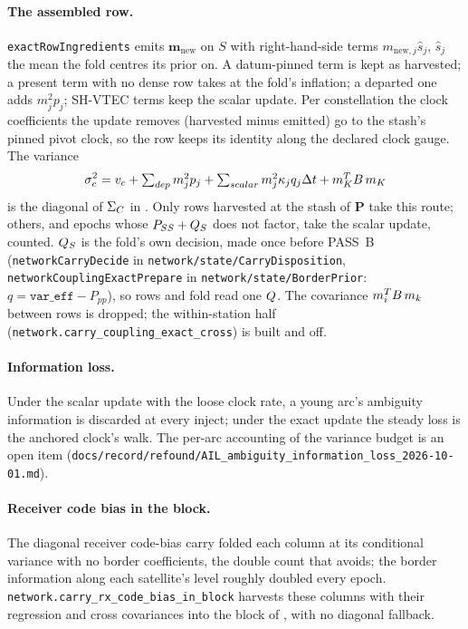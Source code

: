 \documentclass[main.tex]{subfiles}
\begin{document}
\paragraph{The assembled row.}
\texttt{exactRowIngredients} emits $\bm{m}_{\mathrm{new}}$ on $S$ with
right-hand-side terms $m_{\mathrm{new},j}\hat s_j$, $\hat s_j$ the mean the
fold centres its prior on. A datum-pinned term is kept as harvested; a
present term with no dense row takes  at the fold's
inflation; a departed one adds $m_j^2 p_j$; SH-VTEC terms keep the scalar
update. Per constellation the clock coefficients the update removes
(harvested minus emitted) go to the stash's pinned pivot clock, so the row
keeps its identity along the declared clock gauge. The variance
\begin{equation}
\sigma_c^2 = v_c + \textstyle\sum_{dep} m_j^2 p_j
 + \textstyle\sum_{scalar} m_j^2\kappa_j q_j\Delta t
 + m_K^{T}B\,m_K
\label{eq:veh-exactrow}
\end{equation}
is the diagonal of $\Sigma_{C}$ in . Only rows harvested at
the stash of $\bm{P}$ take this route; others, and epochs whose
$P_{SS} + Q_S$ does not factor, take the scalar update, counted.
$Q_S$ is the fold's own decision, made once before PASS~B
(\texttt{networkCarryDecide} in \texttt{network/state/CarryDisposition},
\texttt{networkCouplingExactPrepare} in \texttt{network/state/BorderPrior}:
$q = \texttt{var\_eff} - P_{pp}$), so rows and fold read one $Q$. The
covariance $m_i^{T}B\,m_k$ between rows is dropped; the
within-station half (\texttt{network.carry\_coupling\_exact\_cross}) is
built and off.

\paragraph{Information loss.}
Under the scalar update with the loose clock rate, a young arc's ambiguity
information is discarded at every inject; under the exact update the steady
loss is the anchored clock's walk. The per-arc accounting of the variance
budget is an open item
(\texttt{docs/record/refound/AIL\_ambiguity\_information\_loss\_2026-10-01.md}).

\paragraph{Receiver code bias in the block.}
The diagonal receiver code-bias carry folded each column at its
conditional variance with no border coefficients, the double count that
 avoids; the border information along each satellite's
level roughly doubled every epoch.
\texttt{network.carry\_rx\_code\_bias\_in\_block} harvests these columns
with their regression and cross covariances into the block of
, with no diagonal fallback.
\end{document}
